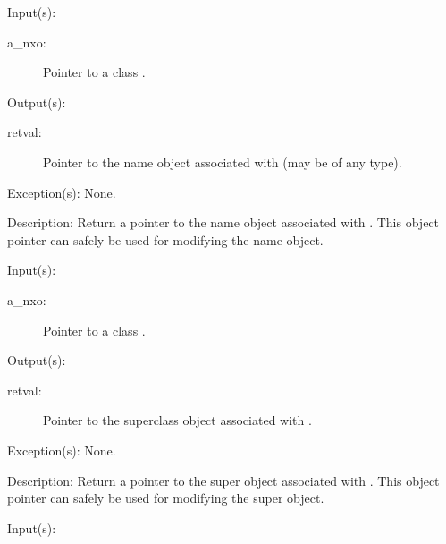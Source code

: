 \begin{capi}
\begin{capilist}
	\item[Input(s): ]
		\begin{description}\item[]
		\item[a\_nxo: ]
			Pointer to a class .
		\end{description}
	\item[Output(s): ]
		\begin{description}\item[]
		\item[retval: ]
			Pointer to the name object associated with 
			(may be of any type).
		\end{description}
	\item[Exception(s): ] None.
	\item[Description: ]
		Return a pointer to the name object associated with
		.  This object pointer can safely be used for
		modifying the name object.
	\end{capilist}
\label{nxo_class_super_get}
	\begin{capilist}
	\item[Input(s): ]
		\begin{description}\item[]
		\item[a\_nxo: ]
			Pointer to a class .
		\end{description}
	\item[Output(s): ]
		\begin{description}\item[]
		\item[retval: ]
			Pointer to the superclass object associated with
			.
		\end{description}
	\item[Exception(s): ] None.
	\item[Description: ]
		Return a pointer to the super object associated with
		.  This object pointer can safely be used for
		modifying the super object.
	\end{capilist}
\label{nxo_class_methods_get}
	\begin{capilist}
	\item[Input(s): ]
		\begin{description}\item[]

\end{description}
\end{capilist}
\end{capi}
